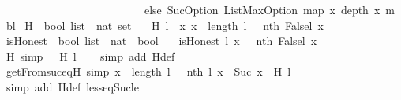 \begin{isabellebody}
\ \ \ \ \ \ \ \ \ \ \ \ \ \ \ \ \ \ \ \ \ \ \ \ \ \ else\ SucOption\ {\isacharparenleft}ListMaxOption\ {\isacharparenleft}map\ {\isacharparenleft}{\isasymlambda}x{\isachardot}\ depth\ x\ m{\isacharparenright}\ bl{\isacharparenright}{\isacharparenright}{\isacharparenright}{\isachardoublequoteclose}\isanewline
\isanewline
{}\isamarkupfalse%
\ H\ {\isacharcolon}{\isacharcolon}\ {\isachardoublequoteopen}bool\ list\ {\isasymRightarrow}\ nat\ set{\isachardoublequoteclose}\ \isanewline
\ \ {\isachardoublequoteopen}H\ l\ {\isacharequal}\ {\isacharbraceleft}x{\isachardot}\ x\ {\isasymle}\ length\ l\ {\isasymand}\ {\isasymnot}\ {\isacharparenleft}nth\ {\isacharparenleft}False{\isacharhash}l{\isacharparenright}\ x{\isacharparenright}{\isacharbraceright}{\isachardoublequoteclose}\isanewline
\isanewline
{}\isamarkupfalse%
\ isHonest\ {\isacharcolon}{\isacharcolon}\ {\isachardoublequoteopen}bool\ list\ {\isasymRightarrow}\ nat\ {\isasymRightarrow}\ bool{\isachardoublequoteclose}\ \isanewline
\ \ {\isachardoublequoteopen}isHonest\ l\ x\ {\isacharequal}\ {\isacharparenleft}{\isasymnot}\ {\isacharparenleft}nth\ {\isacharparenleft}False{\isacharhash}l{\isacharparenright}\ x{\isacharparenright}{\isacharparenright}{\isachardoublequoteclose}\isanewline
\ \ \isanewline
{}\isamarkupfalse%
\ H{\isacharunderscore}{}\ {\isacharbrackleft}simp{\isacharbrackright}{\isacharcolon}\ {\isachardoublequoteopen}{}\ {\isasymin}\ H\ l{\isachardoublequoteclose}\isanewline
%
\isadelimproof
\ \ %
\endisadelimproof
%
\isatagproof
{}\isamarkupfalse%
\ {\isacharparenleft}simp\ add{\isacharcolon}\ H{\isacharunderscore}def{\isacharparenright}%
\endisatagproof
{\isafoldproof}%
%
\isadelimproof
\isanewline
%
\endisadelimproof
\ \ \isanewline
{}\isamarkupfalse%
\ getFrom{\isacharunderscore}suc{\isacharunderscore}eq{\isacharunderscore}H\ {\isacharbrackleft}simp{\isacharbrackright}{\isacharcolon}\ {\isachardoublequoteopen}x\ {\isacharless}\ length\ l\ {\isasymand}\ {\isasymnot}\ nth\ l\ x\ {\isasymlongleftrightarrow}\ Suc\ x\ {\isasymin}\ H\ l{\isachardoublequoteclose}\isanewline
%
\isadelimproof
\ \ %
\endisadelimproof
%
\isatagproof
{}\isamarkupfalse%
\ {\isacharparenleft}simp\ add{\isacharcolon}\ H{\isacharunderscore}def\ less{\isacharunderscore}eq{\isacharunderscore}Suc{\isacharunderscore}le{\isacharparenright}%
\endisatagproof
{\isafoldproof}%
%
\isadelimproof
\isanewline
%
\endisadelimproof
\ \ \isanewline
\isanewline
{}\isamarkupfalse%

\end{isabellebody}
